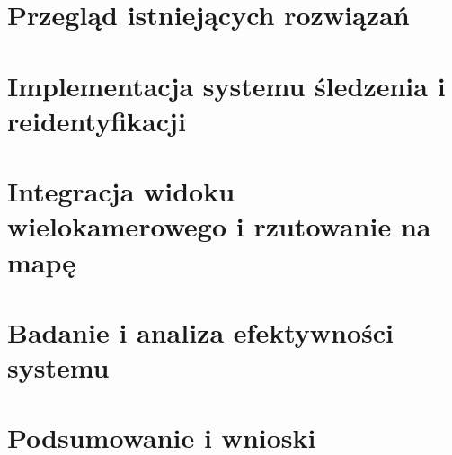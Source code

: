 

\chapter{Przegląd istniejących rozwiązań}\label{chap:przegląd_rozwiązań}
\chapter{Implementacja systemu śledzenia i reidentyfikacji}\label{chap:implementacja}
\chapter{Integracja widoku wielokamerowego i rzutowanie na mapę}\label{chap:integracja_mapy}
\chapter{Badanie i analiza efektywności systemu}\label{chap:badanie_efektywności}
\chapter{Podsumowanie i wnioski}\label{chap:podsumowanie}

